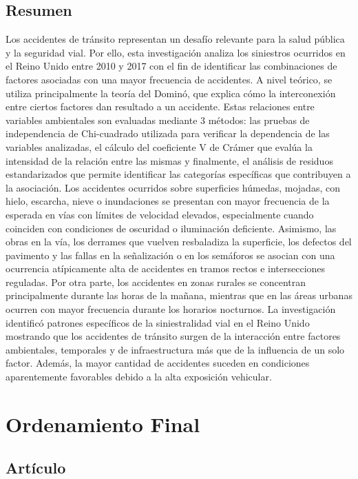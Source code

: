 \documentclass[12pt]{article}
\begin{document}
\subsection{Resumen}
Los accidentes de tránsito representan un desafío relevante para la salud pública 
  y la seguridad vial. Por ello, esta investigación analiza los siniestros ocurridos 
  en el Reino Unido entre 2010 y 2017 con el fin de identificar las combinaciones 
  de factores asociadas con una mayor frecuencia de accidentes. A nivel teórico, 
  se utiliza principalmente la teoría del Dominó, que explica cómo la interconexión 
  entre ciertos factores dan resultado a un accidente. Estas relaciones entre 
  variables ambientales son evaluadas mediante 3 métodos: las pruebas de independencia 
  de Chi-cuadrado utilizada para verificar la dependencia de las variables analizadas, 
  el cálculo del coeficiente V de Crámer que evalúa la intensidad de la relación
  entre las mismas y finalmente, el análisis de residuos estandarizados que permite 
  identificar las categorías específicas que contribuyen a la asociación. Los accidentes 
  ocurridos sobre superficies húmedas, mojadas, con hielo, escarcha, nieve o inundaciones 
  se presentan con mayor frecuencia de la esperada en vías con límites de velocidad 
  elevados, especialmente cuando coinciden con condiciones de oscuridad o iluminación 
  deficiente. Asimismo, las obras en la vía, los derrames que vuelven resbaladiza 
  la superficie, los defectos del pavimento y las fallas en la señalización o en 
  los semáforos se asocian con una ocurrencia atípicamente alta de accidentes en 
  tramos rectos e intersecciones reguladas. Por otra parte, los accidentes en zonas
  rurales se concentran principalmente durante las horas de la mañana, mientras que 
  en las áreas urbanas ocurren con mayor frecuencia durante los horarios nocturnos. 
  La investigación identificó patrones específicos de la siniestralidad vial en el
  Reino Unido mostrando que los accidentes de tránsito surgen de la interacción 
  entre factores ambientales, temporales y de infraestructura más que de la influencia 
  de un solo factor. Además, la mayor cantidad de accidentes suceden en condiciones 
  aparentemente favorables debido a la alta exposición vehicular. \\
  \newpage
\section{Ordenamiento Final} 
\subsection{Artículo}
\end{document}
